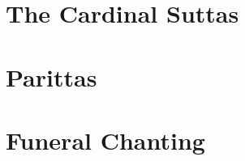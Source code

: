\suttasPartSettings

\part{The Cardinal Suttas}

\suttasChapterSettings



\suttasSettingsRestore

\parittasPartSettings

\part{Parittas}

\parittasChapterSettings



\parittasSettingsRestore

\funeralPartSettings

\part{Funeral Chanting}

\funeralChapterSettings



\funeralSettingsRestore

